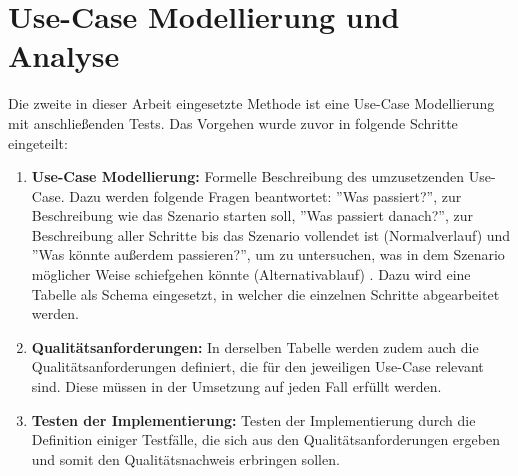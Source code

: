 \section{Use-Case Modellierung und Analyse}

Die zweite in dieser Arbeit eingesetzte Methode ist eine Use-Case Modellierung mit anschließenden Tests. Das Vorgehen wurde zuvor in folgende Schritte eingeteilt:
\begin{enumerate}
    \item \textbf{Use-Case Modellierung:} Formelle Beschreibung des umzusetzenden Use-Case. Dazu werden folgende Fragen beantwortet: ''Was passiert?'', zur Beschreibung wie das Szenario starten soll, ''Was passiert danach?'', zur Beschreibung aller Schritte bis das Szenario vollendet ist (Normalverlauf) und ''Was könnte außerdem passieren?'', um zu untersuchen, was in dem Szenario möglicher Weise schiefgehen könnte (Alternativablauf) \cite[Vgl.][S. 52]{Rosenberg2007}. Dazu wird eine Tabelle als Schema eingesetzt, in welcher die einzelnen Schritte abgearbeitet werden.
    \item \textbf{Qualitätsanforderungen:} In derselben Tabelle werden zudem auch die Qualitätsanforderungen definiert, die für den jeweiligen Use-Case relevant sind. Diese müssen in der Umsetzung auf jeden Fall erfüllt werden.
    \item \textbf{Testen der Implementierung:} Testen der Implementierung durch die Definition einiger Testfälle, die sich aus den Qualitätsanforderungen ergeben und somit den Qualitätsnachweis erbringen sollen.
\end{enumerate}